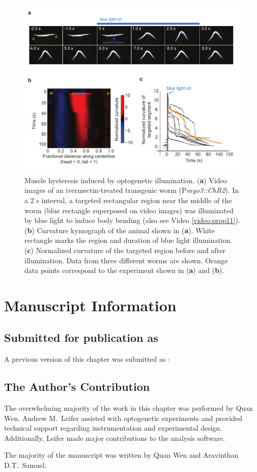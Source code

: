 \begin{figure} 
\includegraphics[width=\textwidth]{figures/prop_sup4}
\caption[Muscle hysteresis induced by optogenetic illumination. ] { Muscle hysteresis induced by optogenetic illumination. 
(\textbf{a}) Video images of an ivermectin-treated transgenic worm (P\textit{myo3::ChR2}). In a 2 s interval, 
a targeted rectangular region near the middle of the worm (blue rectangle superposed on video 
images) was illuminated by blue light to induce body bending (also see Video  \ref{video:prop11}). 
(\textbf{b}) Curvature kymograph of the animal shown in (\textbf{a}). White rectangle marks the region and 
duration of blue light illumination. 
(\textbf{c}) Normalized curvature of the targeted region before and after illumination. Data from three 
different worms are shown. Orange data points correspond to the experiment shown in (\textbf{a}) and (\textbf{b}).
\label{fig:prop_sup4}}
\end{figure}




\section{Manuscript Information}
\subsection{Submitted for publication as}
A previous version of this chapter was submitted as \citep{wen_bending_2011}:


\subsection{The Author's Contribution}
The overwhelming majority of the work in this chapter was performed by Quan Wen. Andrew M.~Leifer assisted with optogenetic experiments and provided technical support regarding instrumentation and experimental design. Additionally, Leifer made major contributions to the analysis software. 

The majority of the manuscript was written by Quan Wen and Aravinthan D.T.~Samuel.
